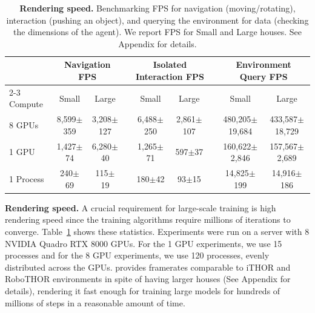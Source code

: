 \begin{table}
    \centering
    \small
    \begin{tabular}{l cc c cc c cc}
        \toprule
        & \multicolumn{2}{c}{Navigation FPS} && \multicolumn{2}{c}{Isolated Interaction FPS} && \multicolumn{2}{c}{Environment Query FPS} \\
        \cmidrule{2-3}\cmidrule{5-6}\cmidrule{8-9}
        Compute & Small & Large && Small & Large && Small & Large \\
        \midrule
        8 GPUs & 8,599{\scriptsize$\pm$359} & 3,208{\scriptsize$\pm$127} && 6,488{\scriptsize$\pm$250} & 2,861{\scriptsize$\pm$107} && 480,205{\scriptsize$\pm$19,684} & 433,587{\scriptsize$\pm$18,729} \\
        1 GPU & 1,427{\scriptsize$\pm$74} & 6,280{\scriptsize$\pm$40} && 1,265{\scriptsize$\pm$71}  & 597{\scriptsize$\pm$37} && 160,622{\scriptsize$\pm$2,846} & 157,567{\scriptsize$\pm$2,689}\\
        1 Process & 240{\scriptsize$\pm$69} & 115{\scriptsize$\pm$19} && 180{\scriptsize$\pm$42} & 93{\scriptsize$\pm$15} &&
        14,825{\scriptsize$\pm$199} & 14,916{\scriptsize$\pm$186}\\
        \bottomrule
    \end{tabular}%
    \vspace{0.05in}
    \caption{\textbf{Rendering speed.} Benchmarking FPS for navigation (\eg moving/rotating), interaction (\eg pushing an object), and querying the environment for data (\eg checking the dimensions of the agent). We report FPS for Small and Large houses. See Appendix for details.}
    \label{tab:fps}
    \vspace{-0.2in}
\end{table}

\noindent \textbf{Rendering speed.} A crucial requirement for large-scale training is high rendering speed since the training algorithms require millions of iterations to converge. Table~\ref{tab:fps} shows these statistics. Experiments were run on a server with 8 NVIDIA Quadro RTX 8000 GPUs. For the 1 GPU experiments, we use 15 processes and for the 8 GPU experiments, we use 120 processes, evenly distributed across the GPUs. \env provides framerates comparable to iTHOR and RoboTHOR environments in spite of having larger houses (See Appendix for details), rendering it fast enough for training large models for hundreds of millions of steps in a reasonable amount of time. 



